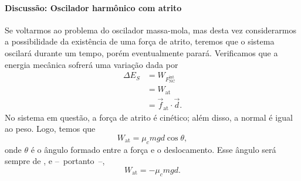\paragraph{Discussão: Oscilador harmônico com atrito}

Se voltarmos ao problema do oscilador massa-mola, mas desta vez considerarmos a possibilidade da existência de uma força de atrito, teremos que o sistema oscilará durante um tempo, porém eventualmente parará. Verificamos que a energia mecânica sofrerá uma variação dada por
\begin{align}
    \Delta E_S &= W_{F_{\textrm{NC}}^{\textrm{int}}} \\
    &= W_{\textrm{at}} \\
    &= \vec{f}_{\textrm{at}} \cdot \vec{d}.
\end{align}
%
No sistema em questão, a força de atrito é cinético; além disso, a normal é igual ao peso. Logo, temos que
\begin{equation}
    W_{\textrm{at}} = \mu_c m g d \cos \theta,
\end{equation}
%
onde $\theta$ é o ângulo formado entre a força e o deslocamento. Esse ângulo será sempre de , e --~portanto~--,
\begin{equation}
    W_{\textrm{at}} = - \mu_c m g d.
\end{equation}

